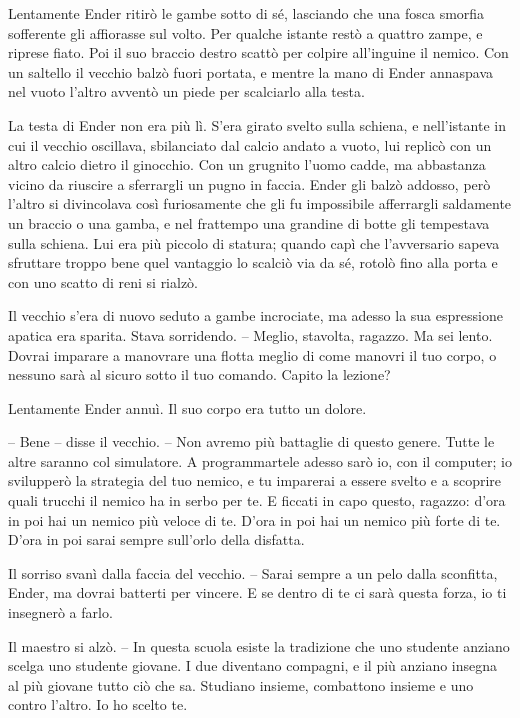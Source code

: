 {Lentamente Ender ritirò le gambe sotto di sé, lasciando che una fosca
	smorfia sofferente gli affiorasse sul volto. Per qualche istante restò a
	quattro zampe, e riprese fiato. Poi il suo braccio destro scattò per
	colpire all'inguine il nemico. Con un saltello il vecchio balzò fuori
	portata, e mentre la mano di Ender annaspava nel vuoto l'altro avventò
	un piede per scalciarlo alla testa.}

{La testa di Ender non era più lì. S'era girato svelto sulla schiena, e
	nell'istante in cui il vecchio oscillava, sbilanciato dal calcio andato
	a vuoto, lui replicò con un altro calcio dietro il ginocchio. Con un
	grugnito l'uomo cadde, ma abbastanza vicino da riuscire a sferrargli un
	pugno in faccia. Ender gli balzò addosso, però l'altro si divincolava
	così furiosamente che gli fu impossibile afferrargli saldamente un
	braccio o una gamba, e nel frattempo una grandine di botte gli
	tempestava sulla schiena. Lui era più piccolo di statura; quando capì
	che l'avversario sapeva sfruttare troppo bene quel vantaggio lo scalciò
	via da sé, rotolò fino alla porta e con uno scatto di reni si rialzò.}

{Il vecchio s'era di nuovo seduto a gambe incrociate, ma adesso la sua
	espressione apatica era sparita. Stava sorridendo. -- Meglio, stavolta,
	ragazzo. Ma sei lento. Dovrai imparare a manovrare una flotta meglio di
	come manovri il tuo corpo, o nessuno sarà al sicuro sotto il tuo
	comando. Capito la lezione?}

{Lentamente Ender annuì. Il suo corpo era tutto un dolore.}

{-- Bene -- disse il vecchio. -- Non avremo più battaglie di questo
	genere. Tutte le altre saranno col simulatore. A programmartele adesso
	sarò io, con il computer; io svilupperò la strategia del tuo nemico, e
	tu imparerai a essere svelto e a scoprire quali trucchi il nemico ha in
	serbo per te. E ficcati in capo questo, ragazzo: d'ora in poi hai un
	nemico più veloce di te. D'ora in poi hai un nemico più forte di te.
	D'ora in poi sarai sempre sull'orlo della disfatta.}

{Il sorriso svanì dalla faccia del vecchio. -- Sarai sempre a un pelo
	dalla sconfitta, Ender, ma dovrai batterti per vincere. E se dentro di
	te ci sarà questa forza, io ti insegnerò a farlo.}

{Il maestro si alzò. -- In questa scuola esiste la tradizione che uno
	studente anziano scelga uno studente giovane. I due diventano compagni,
	e il più anziano insegna al più giovane tutto ciò che sa. Studiano
	insieme, combattono insieme e uno contro l'altro. Io ho scelto te.}

